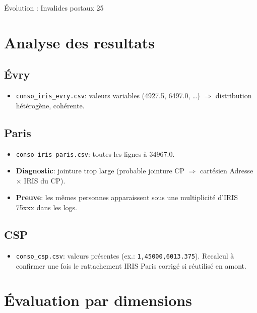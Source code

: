 Évolution : Invalides postaux 25%

\section{Analyse des resultats}
\subsection{Évry}
\begin{itemize}
\item \texttt{conso_iris_evry.csv}: valeurs variables (\num{4927.5}, \num{6497.0}, \dots) $\Rightarrow$ distribution hétérogène, cohérente.
\end{itemize}

\subsection{Paris}
\begin{itemize}
\item \texttt{conso_iris_paris.csv}: toutes les lignes à \num{34967.0}.
\item \textbf{Diagnostic}: jointure trop large (probable jointure CP $\Rightarrow$ cartésien Adresse $\times$ IRIS du CP).
\item \textbf{Preuve}: les mêmes personnes apparaissent sous une multiplicité d'IRIS 75xxx dans les logs.
\end{itemize}

\subsection{CSP}
\begin{itemize}
\item \texttt{conso_csp.csv}: valeurs présentes (ex.: \texttt{1,45000,6013.375}). Recalcul à confirmer une fois le rattachement IRIS Paris corrigé si réutilisé en amont.
\end{itemize}

\section{Évaluation par dimensions}

